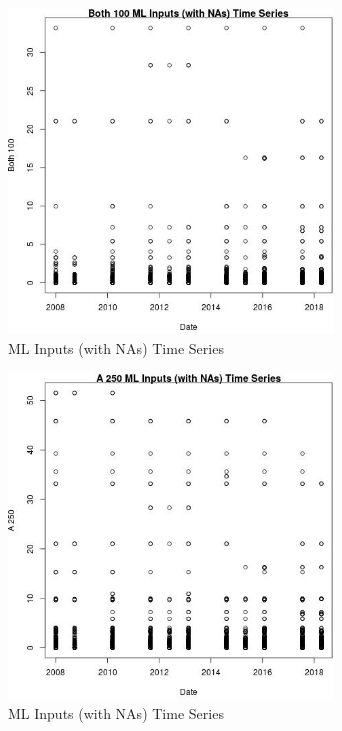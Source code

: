 \begin{figure} 
\centering  
\includegraphics[width=0.77\textwidth]{Code_Outputs/Report_ML_input_PM25_Step4_part_e_de_duplicated_aves_compiled_2019-05-18wNAs_Both_100vDate.jpg} 
\caption{\label{fig:Report_ML_input_PM25_Step4_part_e_de_duplicated_aves_compiled_2019-05-18wNAsBoth_100vDate}ML Inputs (with NAs) Time Series} 
\end{figure} 
 

\begin{figure} 
\centering  
\includegraphics[width=0.77\textwidth]{Code_Outputs/Report_ML_input_PM25_Step4_part_e_de_duplicated_aves_compiled_2019-05-18wNAs_A_250vDate.jpg} 
\caption{\label{fig:Report_ML_input_PM25_Step4_part_e_de_duplicated_aves_compiled_2019-05-18wNAsA_250vDate}ML Inputs (with NAs) Time Series} 
\end{figure} 
 

